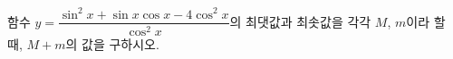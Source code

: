 함수 $y=\dfrac{\sin^2 x+\sin x\cos x-4\cos^2 x}{\cos^2 x}$의 최댓값과 최솟값을 각각 $M$, $m$이라 할 때, $M+m$의 값을 구하시오. 
